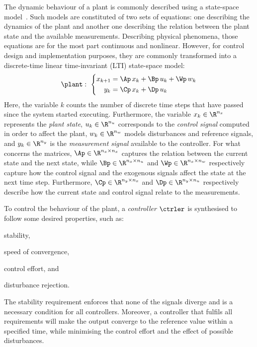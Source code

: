 The dynamic behaviour of a plant is commonly described using a state-space model~\cite{Astrom:2008}. 
Such models are constituted of two sets of equations: one describing the dynamics of the plant and another one describing the relation between the plant state and the available measurements. 
Describing physical phenomena, those equations are for the most part continuous and nonlinear. 
However, for control design and implementation purposes, they are commonly transformed into a discrete-time linear time-invariant (LTI) state-space model:
\begin{equation}
    \label{eq:plant}
    \plant: \,\, \left\{
    \begin{aligned}
        x_{k+1} &= \Ap\,x_k + \Bp\,u_k + \Wp\,w_k \\
        y_k &= \Cp\,x_k + \Dp\,u_k 
    \end{aligned}
    \right.
\end{equation}
Here, the variable $k$ counts the number of discrete time steps that have passed since the system started executing. 
Furthermore, the variable $x_k \in \R^{n_x}$ represents the \emph{plant state}, $u_k \in \R^{n_u}$ corresponds to the \emph{control signal} computed in order to affect the plant, $w_k \in \R^{n_w}$ models disturbances and reference signals, and $y_k \in \R^{n_y}$ is the \emph{measurement signal} available to the controller. 
For what concerns the matrices, $\Ap \in \R^{n_x \times n_x}$ captures the relation between the current state and the next state, while $\Bp \in \R^{n_x \times n_u}$ and $\Wp \in \R^{n_x \times n_w}$ respectively capture how the control signal and the exogenous signals affect the state at the next time step.
Furthermore, $\Cp \in \R^{n_y \times n_x}$ and $\Dp \in \R^{n_y \times n_u}$ respectively describe how the current state and control signal relate to the measurements.

To control the behaviour of the plant, a \emph{controller} $\ctrler$ is synthesised to follow some desired properties, such as: 
\begin{enumerate*}[label=(\roman*)]
    \item stability, 
    \item speed of convergence, 
    \item control effort, and 
    \item disturbance rejection.
\end{enumerate*}
The stability requirement enforces that none of the signals diverge and is a necessary condition for all controllers.
Moreover, a controller that fulfils all requirements will make the output converge to the reference value within a specified time, while minimising the control effort and the effect of possible disturbances.

